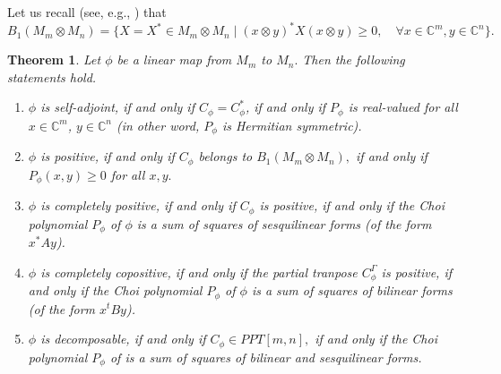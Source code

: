 \documentclass[12pt,a4paper]{amsart}
\theoremstyle{plain}
\newtheorem{theorem}{Theorem}[section]
\theoremstyle{remark}
\theoremstyle{definition}
\def \C {\mathbb{C}}
\begin{document}
Let us recall (see, e.g., \cite{Keybook, OsakaBook24}) that
$$B_1(M_m \otimes M_n) = \{X = X^* \in M_m \otimes M_n \mid (x \otimes y)^* X (x \otimes y) \ge 0, \quad \forall x \in \mathbb{C}^m, y \in \mathbb{C}^n\}.$$




\begin{theorem}\label{Thrm1}
	Let $\phi$ be a linear map from $M_m $ to $M_n.$ Then the following statements hold.
\begin{enumerate}
	\item $\phi$ is self-adjoint, if and only if $C_{\phi} = C_{\phi}^*$, if and only if $P_{\phi}$ is real-valued for all $x\in \C^m$, $y\in \C^n$ (in other word, $P_{\phi}$ is Hermitian symmetric).
	\item $\phi$ is positive, if and only if $C_{\phi}$ belongs to $B_1(M_m\otimes M_n),$ if and only if $P_{\phi}(x,y) \ge 0$ for all $x,y.$
	\item $\phi$ is completely positive, if and only if $C_{\phi}$ is positive, if and only if the Choi polynomial $P_{\phi}$ of $\phi$ is a sum of squares of sesquilinear forms (of the form $ x^* A y$). 
	\item $\phi$ is completely copositive, if and only if the partial tranpose $C_{\phi}^{\Gamma}$ is positive, if and only if the Choi polynomial $P_{\phi}$ of $\phi$ is a sum of squares of bilinear forms (of the form $x^t B y$).
	\item $\phi$ is decomposable, if and only if $C_{\phi} \in PPT[m,n],$ if and only if the Choi polynomial $P_{\phi}$ of is a sum of squares of bilinear and sesquilinear forms.%
\end{enumerate}
\end{theorem}
\end{document}
